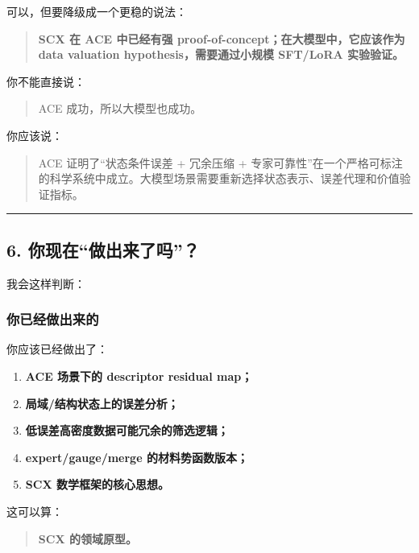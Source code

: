 \documentclass[
  12pt,
]{ctexart}
\providecommand{\tightlist}{%
  \setlength{\itemsep}{0pt}\setlength{\parskip}{0pt}}
\begin{document}
可以，但要降级成一个更稳的说法：

\begin{quote}
\textbf{SCX 在 ACE 中已经有强 proof-of-concept；在大模型中，它应该作为
data valuation hypothesis，需要通过小规模 SFT/LoRA 实验验证。}
\end{quote}

你不能直接说：

\begin{quote}
ACE 成功，所以大模型也成功。
\end{quote}

你应该说：

\begin{quote}
ACE 证明了``状态条件误差 + 冗余压缩 +
专家可靠性''在一个严格可标注的科学系统中成立。大模型场景需要重新选择状态表示、误差代理和价值验证指标。
\end{quote}

\begin{center}\rule{0.5\linewidth}{0.5pt}\end{center}

\subsection{6.
你现在``做出来了吗''？}\label{ux4f60ux73b0ux5728ux505aux51faux6765ux4e86ux5417}

我会这样判断：

\subsubsection{你已经做出来的}\label{ux4f60ux5df2ux7ecfux505aux51faux6765ux7684}

你应该已经做出了：

\begin{enumerate}
\def\labelenumi{\arabic{enumi}.}
\tightlist
\item
  \textbf{ACE 场景下的 descriptor residual map；}
\item
  \textbf{局域/结构状态上的误差分析；}
\item
  \textbf{低误差高密度数据可能冗余的筛选逻辑；}
\item
  \textbf{expert/gauge/merge 的材料势函数版本；}
\item
  \textbf{SCX 数学框架的核心思想。}
\end{enumerate}

这可以算：

\begin{quote}
\textbf{SCX 的领域原型。}
\end{quote}
\end{document}
